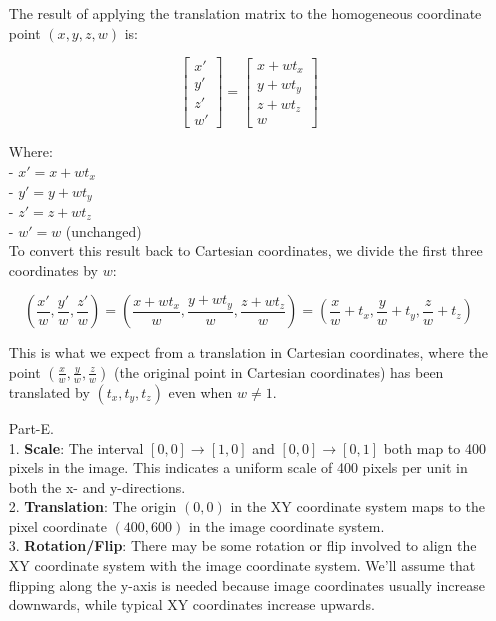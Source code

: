 \documentclass[12pt]{report}
\begin{document}
\begin{enumerate}
    The result of applying the translation matrix to the homogeneous coordinate point \((x, y, z, w)\) is:

    \[
    \begin{bmatrix}
    x' \\
    y' \\
    z' \\
    w'
    \end{bmatrix}
    =
    \begin{bmatrix}
    x + w t_x \\
    y + w t_y \\
    z + w t_z \\
    w
    \end{bmatrix}
    \]

    Where: \\
    - \(x' = x + w t_x\) \\
    - \(y' = y + w t_y\) \\
    - \(z' = z + w t_z\) \\
    - \(w' = w\) (unchanged) \\
    To convert this result back to Cartesian coordinates, we divide the first three coordinates by \(w\):

    \[
    \left( \frac{x'}{w}, \frac{y'}{w}, \frac{z'}{w} \right) =
    \left( \frac{x + w t_x}{w}, \frac{y + w t_y}{w}, \frac{z + w t_z}{w} \right) =
    \left( \frac{x}{w} + t_x, \frac{y}{w} + t_y, \frac{z}{w} + t_z \right)
    \]

    This is what we expect from a translation in Cartesian coordinates, where the point \(\left( \frac{x}{w}, \frac{y}{w}, \frac{z}{w} \right)\) 
    (the original point in Cartesian coordinates) has been translated by \((t_x, t_y, t_z)\) even when \(w \neq 1\).

    \item[Part-E.]  
    \ \\
    1. \textbf{Scale}: The interval $[0,0] \to [1,0]$ and $[0,0] \to [0,1]$ both map to 400 pixels in the image. This indicates a uniform scale of 400 pixels per unit 
    in both the x- and y-directions.\\
    2. \textbf{Translation}: The origin $(0,0)$ in the XY coordinate system maps to the pixel coordinate $(400, 600)$ in the image coordinate system.\\
    3. \textbf{Rotation/Flip}: There may be some rotation or flip involved to align the XY coordinate system with the image coordinate system. We'll assume that flipping 
    along the y-axis is needed because image coordinates usually increase downwards, while typical XY coordinates increase upwards.


\end{enumerate}
\end{document}
